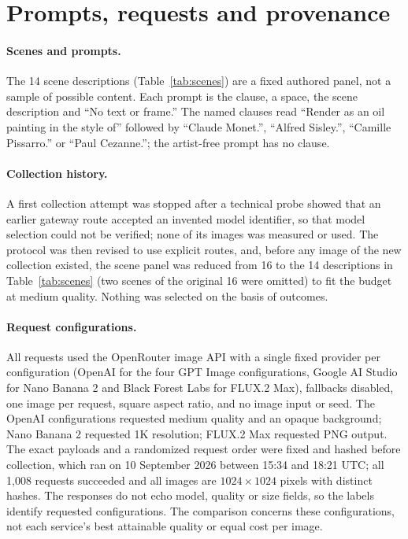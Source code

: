 \section{Prompts, requests and provenance}\label{app:provenance}

\paragraph{Scenes and prompts.}
The 14 scene descriptions (Table~\ref{tab:scenes}) are a fixed authored panel, not a sample of
possible content. Each prompt is the clause, a space, the scene description and ``No text or
frame.'' The named clauses read ``Render as an oil painting in the style of'' followed by
``Claude Monet.'', ``Alfred Sisley.'', ``Camille Pissarro.'' or ``Paul Cezanne.''; the
artist-free prompt has no clause.



\paragraph{Collection history.} A first collection attempt was stopped after a technical probe
showed that an earlier gateway route accepted an invented model identifier, so that model selection
could not be verified; none of its images was measured or used. The protocol was then revised to use
explicit routes, and, before any image of the new collection existed, the scene panel was reduced
from 16 to the 14 descriptions in Table~\ref{tab:scenes} (two scenes of the original 16 were
omitted) to fit the budget at medium quality. Nothing was selected on the basis of outcomes.

\paragraph{Request configurations.}
All requests used the OpenRouter image API with a single fixed provider per configuration
(OpenAI for the four GPT Image configurations, Google AI Studio for Nano Banana 2 and Black
Forest Labs for FLUX.2 Max), fallbacks disabled, one image per request, square aspect ratio,
and no image input or seed. The OpenAI configurations requested medium quality and an opaque
background; Nano Banana 2 requested 1K resolution; FLUX.2 Max requested PNG output. The exact
payloads and a randomized request order were fixed and hashed before collection, which ran on
10 September 2026 between 15:34 and 18:21 UTC; all 1,008 requests succeeded and all images are
$1024\times1024$ pixels with distinct hashes. The responses do not echo model, quality or size
fields, so the labels identify requested configurations. The comparison concerns these
configurations, not each service's best attainable quality or equal cost per image.

